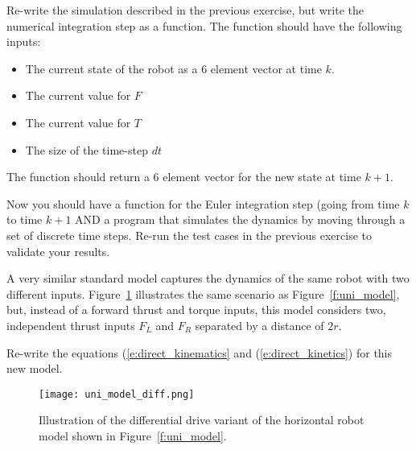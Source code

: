 \begin{ex}
Re-write the simulation described in the previous exercise, but write the numerical integration step as a function.  The function should have the following inputs:
\begin{itemize}
\item The current state of the robot as a 6 element vector at time $k$.
\item The current value for $F$
\item The current value for $T$
\item The size of the time-step $dt$
\end{itemize}
The function should return a 6 element vector for the new state at time $k+1$.

Now you should have a function for the Euler integration step (going from time $k$ to time $k+1$ AND a program that simulates the dynamics by moving through a set of discrete time steps.  Re-run the test cases in the previous exercise to validate your results.
\end{ex}





\begin{ex}
A very similar standard model captures the dynamics of the same robot with two different inputs.  Figure~\ref{f:uni_model_diff} illustrates the same scenario as Figure~\ref{f:uni_model}, but, instead of a forward thrust and torque inputs, this model considers two, independent thrust inputs $F_L$ and $F_R$ separated by a distance of $2r$.

Re-write the equations (\ref{e:direct_kinematics} and (\ref{e:direct_kinetics}) for this new model.

\end{ex}

\begin{figure}[hbt]
\centering
\texttt{[image: uni\_model\_diff.png]}
\caption{Illustration of the differential drive variant of the horizontal robot model shown in Figure~\ref{f:uni_model}.}
\label{f:uni_model_diff}
\end{figure}
